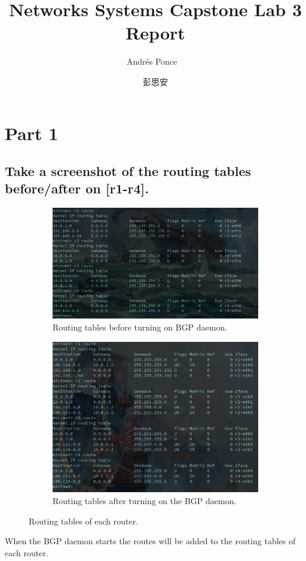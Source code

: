\documentclass{article}
\title{Networks Systems Capstone Lab 3 Report}
\author{Andr\'es Ponce \
\and
彭思安
}
\begin{document}
\maketitle
\section{Part 1}
\subsection{Take a screenshot of the routing tables before/after on [r1-r4].}

\begin{figure}[h]
	\centering
	\begin{subfigure}{0.5\textwidth}
		\centering
		\includegraphics[scale=0.2]{1RoutingBefore.png}
		\caption{Routing tables before turning on BGP daemon.}
	\end{subfigure}%
	\begin{subfigure}{0.5\textwidth}
		\centering
		\includegraphics[scale=0.2]{2RoutingAfter.png}
		\caption{Routing tables after turning on the BGP daemon.}
	\end{subfigure}
	\caption{Routing tables of each router.}
\end{figure}
When the BGP daemon starts the routes will be added to the routing tables of each router.
\end{document}
